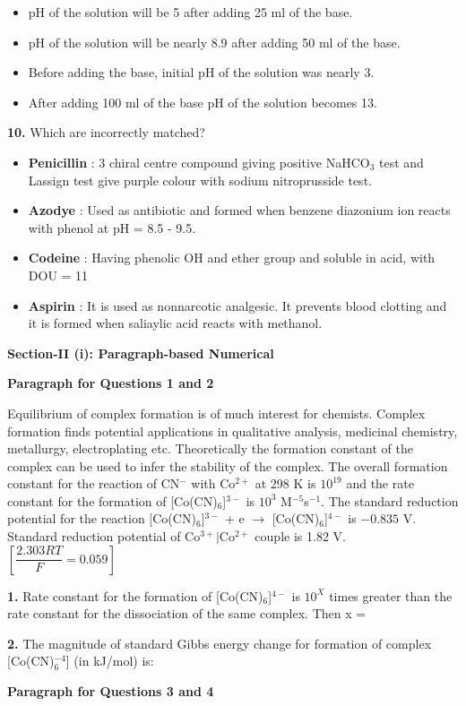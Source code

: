 \documentclass[10pt,twocolumn]{extarticle}
\newenvironment{qoptions}{\begin{itemize}[leftmargin=1.8em,itemsep=2pt,topsep=2pt,label={}]}{\end{itemize}}
\newcommand{\opt}[2]{\item[({#1})] {#2}}
\newcommand{\subsectionhdr}[1]{\par\vspace{3pt}\noindent\textbf{#1}\par\vspace{2pt}}
\begin{document}
\begin{qoptions}
\opt{A}{pH of the solution will be 5 after adding 25 ml of the base.}
\opt{B}{pH of the solution will be nearly 8.9 after adding 50 ml of the base.}
\opt{C}{Before adding the base, initial pH of the solution was nearly 3.}
\opt{D}{After adding 100 ml of the base pH of the solution becomes 13.}
\end{qoptions}

\textbf{10.} Which are incorrectly matched?

\begin{qoptions}
\opt{A}{\textbf{Penicillin} : 3 chiral centre compound giving positive NaHCO$_3$ test and Lassign test give purple colour with sodium nitroprusside test.}
\opt{B}{\textbf{Azodye} : Used as antibiotic and formed when benzene diazonium ion reacts with phenol at pH = 8.5 - 9.5.}
\opt{C}{\textbf{Codeine} : Having phenolic OH and ether group and soluble in acid, with DOU = 11}
\opt{D}{\textbf{Aspirin} : It is used as nonnarcotic analgesic. It prevents blood clotting and it is formed when saliaylic acid reacts with methanol.}
\end{qoptions}

\subsectionhdr{Section-II (i): Paragraph-based Numerical}

\textbf{Paragraph for Questions 1 and 2}

Equilibrium of complex formation is of much interest for chemists. Complex formation finds potential applications in qualitative analysis, medicinal chemistry, metallurgy, electroplating etc. Theoretically the formation constant of the complex can be used to infer the stability of the complex. The overall formation constant for the reaction of CN$^-$ with Co$^{2+}$ at 298 K is $10^{19}$ and the rate constant for the formation of [Co(CN)$_6$]$^{3-}$ is $10^3$ M$^{-5}$s$^{-1}$. The standard reduction potential for the reaction [Co(CN)$_6$]$^{3-}$ + e $\to$ [Co(CN)$_6$]$^{4-}$ is $-0.835$ V. Standard reduction potential of Co$^{3+}|$Co$^{2+}$ couple is 1.82 V. $\left[\dfrac{2.303RT}F=0.059\right]$

\textbf{1.} Rate constant for the formation of [Co(CN)$_6$]$^{4-}$ is $10^X$ times greater than the rate constant for the dissociation of the same complex. Then x =

\textbf{2.} The magnitude of standard Gibbs energy change for formation of complex [Co(CN)$_6^{-4}$] (in kJ/mol) is:

\textbf{Paragraph for Questions 3 and 4}
\end{document}
